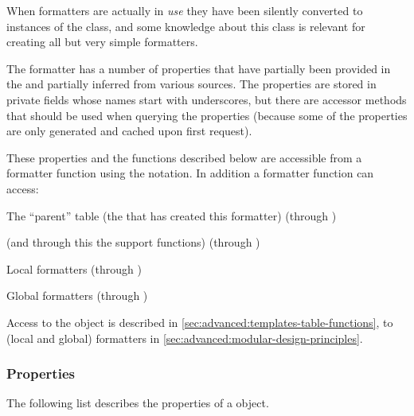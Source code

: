 \documentclass[12pt]{scrartcl}
\begin{document}
When formatters are actually in \emph{use} they have been silently converted to
instances of the  class, and some knowledge about this class
is relevant for creating all but very simple formatters.

The formatter has a number of properties that have partially been provided in
the  and partially inferred from various sources.  The
properties are stored in private fields whose names start with underscores, but
there are accessor methods that should be used when querying the properties
(because some of the properties are only generated and cached upon first
request).

These properties and the functions described below are accessible from a
formatter function using the  notation.  In addition a formatter
function can access:

\begin{itemize*}
\item The “parent” table (the  that has created this formatter)
(through )
\item {} (and through this the support functions) (through
)
\item Local formatters (through )
\item Global formatters (through )
\end{itemize*}

Access to the  object is described in
\vref{sec:advanced:templates-table-functions}, to (local and global) formatters
in \vref{sec:advanced:modular-design-principles}.


\subsubsection{ Properties}
\label{sec:advanced:formatter-properties}

The following list describes the properties of a  object.
\end{document}

